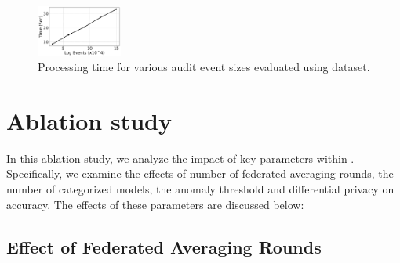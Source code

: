 \begin{figure}[!t]
 \centering
 \includegraphics[width=0.25\textwidth]{fig/sizevstime.pdf}
 \caption{Processing time for various audit event sizes evaluated using \optc dataset.}
 \label{sizevstime}
 \vspace{-2ex}
\end{figure}


\section{Ablation study}
\label{app:ablation}

In this ablation study, we analyze the impact of key parameters within \Sys. Specifically, we examine the effects of number of federated averaging rounds, the number of \gnnshort categorized models, the anomaly threshold and differential privacy on accuracy. The effects of these parameters are discussed below:



\subsection*{Effect of Federated Averaging Rounds}
\label{app:fedrounds}

